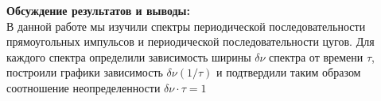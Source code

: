 \documentclass[a4paper, 12pt]{article}%
\begin{document}
\begin{enumerate}
\end{enumerate}
	
	
	\textbf{Обсуждение результатов и выводы: }\\
	
	В данной работе мы изучили спектры периодической последовательности
	прямоугольных импульсов и периодической последовательности цугов. Для каждого спектра определили зависимость ширины $\delta \nu$ спектра от времени $\tau$, построили графики зависимость $\delta\nu(1/\tau)$ и подтвердили таким образом соотношение неопределенности $\delta\nu \cdot \tau = 1$
	
	
	
	
\end{document}
